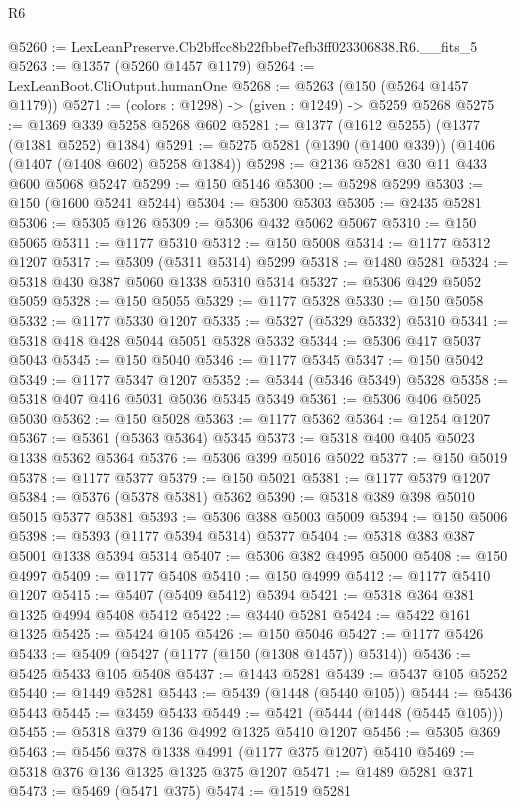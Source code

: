 \begin{lexlean}{R6}
\begin{coremodule}
@5260 := LexLeanPreserve.Cb2bffcc8b22fbbef7efb3ff023306838.R6.__fits_5
@5263 := @1357 (@5260 @1457 @1179)
@5264 := LexLeanBoot.CliOutput.humanOne
@5268 := @5263 (@150 (@5264 @1457 @1179))
@5271 := (colors : @1298) -> (given : @1249) -> @5259 @5268
@5275 := @1369 @339 @5258 @5268 @602
@5281 := @1377 (@1612 @5255) (@1377 (@1381 @5252) @1384)
@5291 := @5275 @5281 (@1390 (@1400 @339)) (@1406 (@1407 (@1408 @602) @5258 @1384))
@5298 := @2136 @5281 @30 @11 @433 @600 @5068 @5247
@5299 := @150 @5146
@5300 := @5298 @5299
@5303 := @150 (@1600 @5241 @5244)
@5304 := @5300 @5303
@5305 := @2435 @5281
@5306 := @5305 @126
@5309 := @5306 @432 @5062 @5067
@5310 := @150 @5065
@5311 := @1177 @5310
@5312 := @150 @5008
@5314 := @1177 @5312 @1207
@5317 := @5309 (@5311 @5314) @5299
@5318 := @1480 @5281
@5324 := @5318 @430 @387 @5060 @1338 @5310 @5314
@5327 := @5306 @429 @5052 @5059
@5328 := @150 @5055
@5329 := @1177 @5328
@5330 := @150 @5058
@5332 := @1177 @5330 @1207
@5335 := @5327 (@5329 @5332) @5310
@5341 := @5318 @418 @428 @5044 @5051 @5328 @5332
@5344 := @5306 @417 @5037 @5043
@5345 := @150 @5040
@5346 := @1177 @5345
@5347 := @150 @5042
@5349 := @1177 @5347 @1207
@5352 := @5344 (@5346 @5349) @5328
@5358 := @5318 @407 @416 @5031 @5036 @5345 @5349
@5361 := @5306 @406 @5025 @5030
@5362 := @150 @5028
@5363 := @1177 @5362
@5364 := @1254 @1207
@5367 := @5361 (@5363 @5364) @5345
@5373 := @5318 @400 @405 @5023 @1338 @5362 @5364
@5376 := @5306 @399 @5016 @5022
@5377 := @150 @5019
@5378 := @1177 @5377
@5379 := @150 @5021
@5381 := @1177 @5379 @1207
@5384 := @5376 (@5378 @5381) @5362
@5390 := @5318 @389 @398 @5010 @5015 @5377 @5381
@5393 := @5306 @388 @5003 @5009
@5394 := @150 @5006
@5398 := @5393 (@1177 @5394 @5314) @5377
@5404 := @5318 @383 @387 @5001 @1338 @5394 @5314
@5407 := @5306 @382 @4995 @5000
@5408 := @150 @4997
@5409 := @1177 @5408
@5410 := @150 @4999
@5412 := @1177 @5410 @1207
@5415 := @5407 (@5409 @5412) @5394
@5421 := @5318 @364 @381 @1325 @4994 @5408 @5412
@5422 := @3440 @5281
@5424 := @5422 @161 @1325
@5425 := @5424 @105
@5426 := @150 @5046
@5427 := @1177 @5426
@5433 := @5409 (@5427 (@1177 (@150 (@1308 @1457)) @5314))
@5436 := @5425 @5433 @105 @5408
@5437 := @1443 @5281
@5439 := @5437 @105 @5252
@5440 := @1449 @5281
@5443 := @5439 (@1448 (@5440 @105))
@5444 := @5436 @5443
@5445 := @3459 @5433
@5449 := @5421 (@5444 (@1448 (@5445 @105)))
@5455 := @5318 @379 @136 @4992 @1325 @5410 @1207
@5456 := @5305 @369
@5463 := @5456 @378 @1338 @4991 (@1177 @375 @1207) @5410
@5469 := @5318 @376 @136 @1325 @1325 @375 @1207
@5471 := @1489 @5281 @371
@5473 := @5469 (@5471 @375)
@5474 := @1519 @5281

\end{coremodule}
\end{lexlean}
